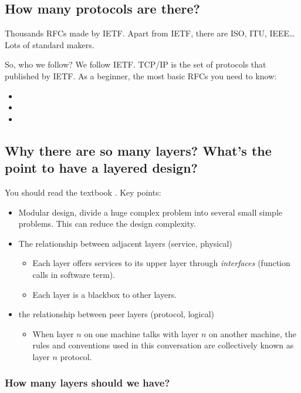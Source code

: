 \documentclass{article}
\begin{document}
\subsection{How many protocols are there?}

Thousands RFCs made by IETF. Apart from IETF, there are ISO, ITU, IEEE\ldots
Lots of standard makers.

So, who we follow? We follow IETF. TCP/IP is the set of protocols that published
by IETF. As a beginner, the most basic RFCs you need to know:
\begin{itemize}
\item {}
\item {}
\item {}
\end{itemize}

\subsection[Why layered design?]{Why there are so many layers? What's the point to have a
  layered design?}

You should read the textbook .
Key points:
\begin{itemize}
\item Modular design, divide a huge complex problem into several small simple
  problems. This can reduce the design complexity.
\item The relationship between adjacent layers (service, physical)
  \begin{itemize}
  \item Each layer offers services to its upper layer through \emph{interfaces} (function
    calls in software term).
  \item Each layer is a blackbox to other layers.
  \end{itemize}
\item the relationship between peer layers (protocol, logical)
  \begin{itemize}
  \item When layer $n$ on one machine talks with layer $n$ on another machine, the rules
    and conventions used in this conversation are collectively known as layer $n$ protocol.
  \end{itemize}
\end{itemize}

\subsubsection{How many layers should we have?}
\label{sec:how-many-layers}
\end{document}
